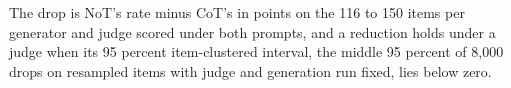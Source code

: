 The drop is NoT's rate minus CoT's in points on the 116 to 150 items per
generator and judge scored under both prompts, and a reduction holds under a
judge when its 95 percent item-clustered interval, the middle 95 percent of
8,000 drops on resampled items with judge and generation run fixed, lies
below zero.

